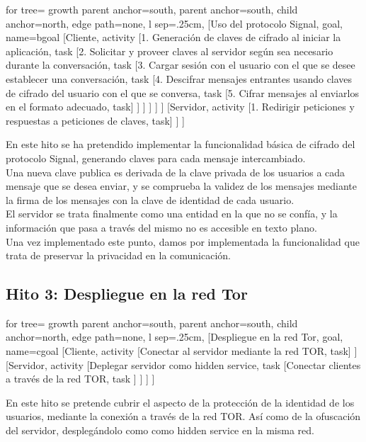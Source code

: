 \begin{adjustbox}{margin=2.5ex 5ex 2.5ex 2.5ex,center}
	\begin{forest} for tree={
			growth parent anchor=south,
			parent anchor=south,
			child anchor=north,
			edge path={none}, 
			l sep=.25cm,
	}   
	[Uso del protocolo Signal, goal, name=bgoal
		[Cliente, activity
		[1. Generación de claves de cifrado al iniciar la aplicación, task
		[2. Solicitar y proveer claves al servidor según sea necesario durante la conversación, task
		[3. Cargar sesión con el usuario con el que se desee establecer una conversación, task
		[4. Descifrar mensajes entrantes usando claves de cifrado del usuario con el que se conversa, task
		[5. Cifrar mensajes al enviarlos\, en el formato adecuado, task] ] ] ] ] ]
		[Servidor, activity
		[1. Redirigir peticiones y respuestas a peticiones de claves, task] ] ] 
	\end{forest}
\end{adjustbox}

En este hito se ha pretendido implementar la funcionalidad básica de cifrado del protocolo Signal, generando claves para cada mensaje intercambiado. \\
Una nueva clave publica es derivada de la clave privada de los usuarios a cada mensaje que se desea enviar, y se comprueba la validez de los mensajes mediante la firma de los mensajes con la clave de identidad de cada usuario. \\ 
El servidor se trata finalmente como una entidad en la que no se confía, y la información que pasa a través del mismo no es accesible en texto plano. \\
Una vez implementado este punto, damos por implementada la funcionalidad que trata de preservar la privacidad en la comunicación. \\ 

\subsection{Hito 3: Despliegue en la red Tor}
\begin{adjustbox}{margin=2.5ex 5ex 2.5ex 2.5ex,center}
	\begin{forest} for tree={
			growth parent anchor=south,
			parent anchor=south,
			child anchor=north,
			edge path={none}, 
			l sep=.25cm,
	}   
	[Despliegue en la red Tor, goal, name=cgoal
		[Cliente, activity
		[Conectar al servidor mediante la red TOR, task] ]
		[Servidor, activity
		[Deplegar servidor como hidden service, task
		[Conectar clientes a través de la red TOR, task ] ] ] ] 
	\end{forest}
\end{adjustbox}

En este hito se pretende cubrir el aspecto de la protección de la identidad de los usuarios, mediante la conexión a través de la red TOR. Así como de la ofuscación del servidor, desplegándolo como como hidden service en la misma red. \\